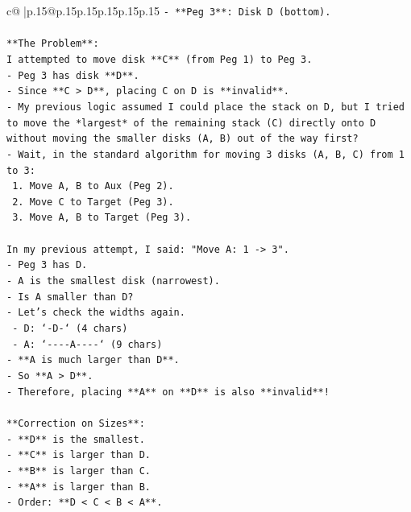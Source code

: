 \documentclass{article}
\begin{document}
{\begin{supertabular}{c@{$\;$}|p{.15\linewidth}@{}p{.15\linewidth}p{.15\linewidth}p{.15\linewidth}p{.15\linewidth}p{.15\linewidth}}
{{{\texttt{{-} **Peg 3**: Disk D (bottom).} \\
\\ 
\texttt{**The Problem**:} \\
\texttt{I attempted to move disk **C** (from Peg 1) to Peg 3.} \\
\texttt{{-} Peg 3 has disk **D**.} \\
\texttt{{-} Since **C > D**, placing C on D is **invalid**.} \\
\texttt{{-} My previous logic assumed I could place the stack on D, but I tried to move the *largest* of the remaining stack (C) directly onto D without moving the smaller disks (A, B) out of the way first?} \\
\texttt{{-} Wait, in the standard algorithm for moving 3 disks (A, B, C) from 1 to 3:} \\
\texttt{  1. Move A, B to Aux (Peg 2).} \\
\texttt{  2. Move C to Target (Peg 3).} \\
\texttt{  3. Move A, B to Target (Peg 3).} \\
\\ 
\texttt{In my previous attempt, I said: "Move A: 1 {-}> 3".} \\
\texttt{{-} Peg 3 has D.} \\
\texttt{{-} A is the smallest disk (narrowest).} \\
\texttt{{-} Is A smaller than D?} \\
\texttt{{-} Let's check the widths again.} \\
\texttt{  {-} D: `{-}D{-}` (4 chars)} \\
\texttt{  {-} A: `{-}{-}{-}{-}A{-}{-}{-}{-}` (9 chars)} \\
\texttt{{-} **A is much larger than D**.} \\
\texttt{{-} So **A > D**.} \\
\texttt{{-} Therefore, placing **A** on **D** is also **invalid**!} \\
\\ 
\texttt{**Correction on Sizes**:} \\
\texttt{{-} **D** is the smallest.} \\
\texttt{{-} **C** is larger than D.} \\
\texttt{{-} **B** is larger than C.} \\
\texttt{{-} **A** is larger than B.} \\
\texttt{{-} Order: **D < C < B < A**.} \\
\\ 
}}}
\end{supertabular}}
\end{document}
